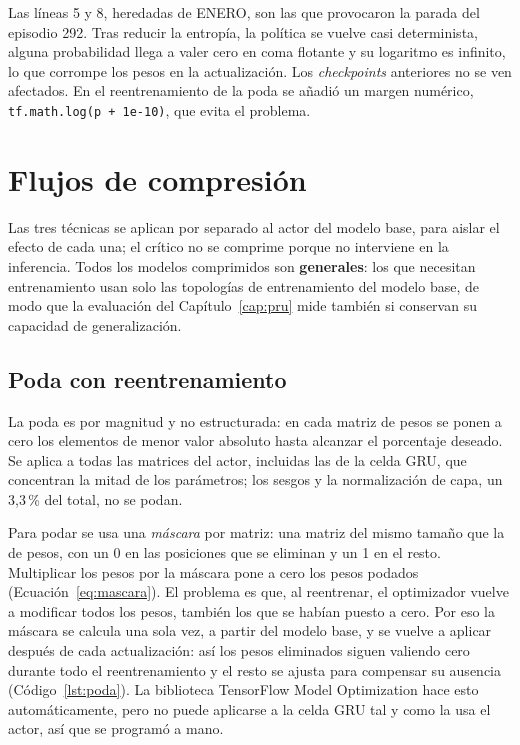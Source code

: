 Las líneas 5 y 8, heredadas de ENERO, son las que provocaron la parada del episodio 292. Tras reducir la entropía, la política se vuelve casi determinista, alguna probabilidad llega a valer cero en coma flotante y su logaritmo es infinito, lo que corrompe los pesos en la actualización. Los \textit{checkpoints} anteriores no se ven afectados. En el reentrenamiento de la poda se añadió un margen numérico, \texttt{tf.math.log(p + 1e-10)}, que evita el problema.

\section{Flujos de compresión}\label{sec:flujos_compresion}\label{sec:hiperparametros_compresion}

Las tres técnicas se aplican por separado al actor del modelo base, para aislar el efecto de cada una; el crítico no se comprime porque no interviene en la inferencia. Todos los modelos comprimidos son \textbf{generales}: los que necesitan entrenamiento usan solo las topologías de entrenamiento del modelo base, de modo que la evaluación del Capítulo~\ref{cap:pru} mide también si conservan su capacidad de generalización.

\subsection{Poda con reentrenamiento}\label{sec:flujo_poda}

La poda es por magnitud y no estructurada: en cada matriz de pesos se ponen a cero los elementos de menor valor absoluto hasta alcanzar el porcentaje deseado. Se aplica a todas las matrices del actor, incluidas las de la celda GRU, que concentran la mitad de los parámetros; los sesgos y la normalización de capa, un 3,3\,\% del total, no se podan.

Para podar se usa una \emph{máscara} por matriz: una matriz del mismo tamaño que la de pesos, con un 0 en las posiciones que se eliminan y un 1 en el resto. Multiplicar los pesos por la máscara pone a cero los pesos podados (Ecuación~\eqref{eq:mascara}). El problema es que, al reentrenar, el optimizador vuelve a modificar todos los pesos, también los que se habían puesto a cero. Por eso la máscara se calcula una sola vez, a partir del modelo base, y se vuelve a aplicar después de cada actualización: así los pesos eliminados siguen valiendo cero durante todo el reentrenamiento y el resto se ajusta para compensar su ausencia (Código~\ref{lst:poda}). La biblioteca TensorFlow Model Optimization hace esto automáticamente, pero no puede aplicarse a la celda GRU tal y como la usa el actor, así que se programó a mano.

